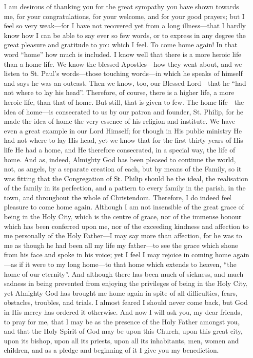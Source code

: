 I am desirous of thanking you for the great sympathy you have shown
towards me, for your congratulations, for your welcome, and for your
good prayers; but I feel so very weak—for I have not recovered yet
from a long illness—that I hardly know how I can be able to say ever
so few words, or to express in any degree the great pleasure and
gratitude to you which I feel. To come home again! In that word
``home'' how much is included. I know well that there is a
more heroic life than a home life. We know the blessed Apostles—how
they went about, and we listen to St. Paul's words—those touching words—in which he speaks of himself and says he was an
outcast. Then we know, too, our Blessed Lord—that he ``had not
where to lay his head''. Therefore, of course, there is a higher
life, a more heroic life, than that of home. But still, that is given
to few. The home life—the idea of home—is consecrated to us by our
patron and founder, St. Philip, for he made the idea of home the very
essence of his religion and institute. We have even a great example in
our Lord Himself; for though in His public ministry He had not where
to lay His head, yet we know that for the first thirty years of His
life He had a home, and He therefore consecrated, in a special way,
the life of home. And as, indeed, Almighty God has been pleased to
continue the world, not, as angels, by a separate creation of each,
but by means of the Family, so it was fitting that the Congregation of
St. Philip should be the ideal, the realisation of the family in its
perfection, and a pattern to every family in the parish, in the town,
and throughout the whole of Christendom. Therefore, I do indeed feel
pleasure to come home again. Although I am not insensible of the great
grace of being in the Holy City, which is the centre of grace,
nor of the immense honour which has been conferred upon me, nor of the
exceeding kindness and affection to me personally of the Holy Father—I
may say more than affection, for he was to me as though he had been
all my life my father—to see the grace which shone from his face and
spoke in his voice; yet I feel I may rejoice in coming home again—as
if it were to my long home—to that home which extends to heaven,
``the home of our eternity''. And although there has been much
of sickness, and much sadness in being prevented from enjoying the
privileges of being in the Holy City, yet Almighty God has brought me
home again in spite of all difficulties, fears, obstacles, troubles,
and trials. I almost feared I should never come back, but God in His
mercy has ordered it otherwise. And now I will ask you, my dear
friends, to pray for me, that I may be as the presence of the Holy
Father amongst you, and that the Holy Spirit of God may be upon this
Church, upon this great city, upon its bishop, upon all its priests,
upon all its inhabitants, men, women and children, and as a pledge
and beginning of it I give you my benediction.

